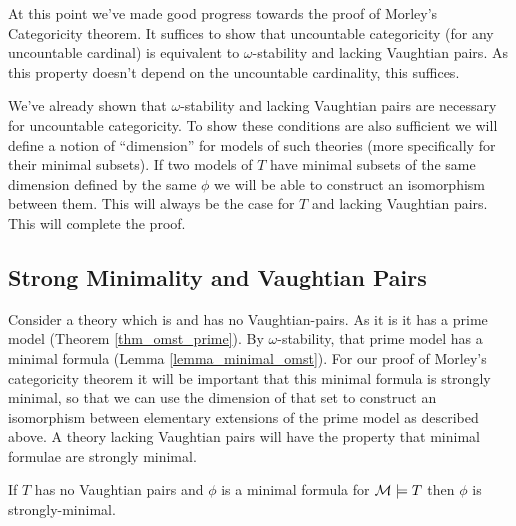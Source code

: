 At this point we've made good progress towards the proof of Morley's Categoricity theorem.
It suffices to show that uncountable categoricity (for any uncountable cardinal) is equivalent to \(\omega\)-stability and lacking Vaughtian pairs.
As this property doesn't depend on the uncountable cardinality, this suffices. 

We've already shown that \(\omega\)-stability and lacking Vaughtian pairs are necessary for uncountable categoricity.
To show these conditions are also sufficient we will define a notion of ``dimension'' for models of such theories (more specifically for their minimal subsets).
If two models of \(T\) have minimal subsets of the same dimension defined by the same \(\phi\) we will be able to construct an isomorphism between them. 
This will always be the case for \(T\) \omst and lacking Vaughtian pairs. 
This will complete the proof. 

\subsection{Strong Minimality and Vaughtian Pairs}

Consider a theory which is \omst and has no Vaughtian-pairs. 
As it is \omst it has a prime model (Theorem \ref{thm_omst_prime}).
By \(\omega\)-stability, that prime model has a minimal formula (Lemma \ref{lemma_minimal_omst}). 
For our proof of Morley's categoricity theorem it will be important that this minimal formula is strongly minimal, so that we can use the dimension of that set to construct an isomorphism between elementary extensions of the prime model  as described above. 
A theory lacking Vaughtian pairs will have the property that minimal formulae are strongly minimal. 

\begin{theorem}\label{theorem_minimal_vaughtian_pair}
If \(T\) has no Vaughtian pairs and \(\phi\) is a minimal formula for \(\mathcal{M} \models T\) then \(\phi\) is strongly-minimal. 
\end{theorem}

